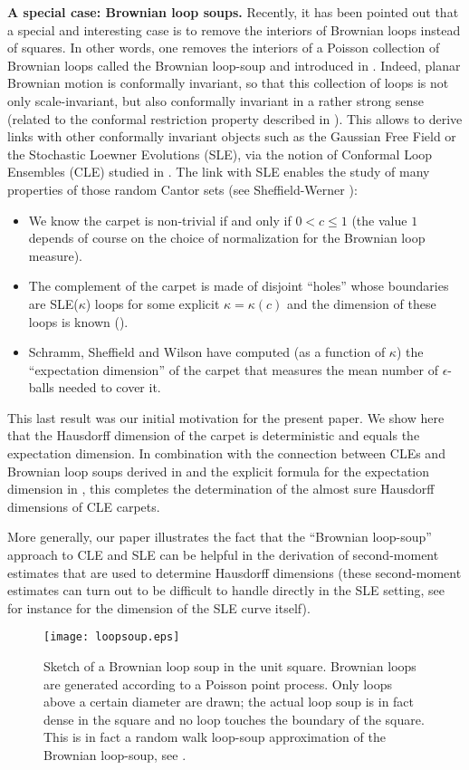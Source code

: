 \documentclass[11pt]{article}
\begin{document}
\medbreak
{\bf A special case: Brownian loop soups.}
Recently, it has been pointed out that a special and interesting case is 
to remove the interiors of Brownian loops instead of squares. 
In other words, one removes the interiors of a Poisson collection of 
Brownian loops called the Brownian loop-soup and introduced in \cite {LWls}. 
Indeed, planar Brownian motion is conformally invariant, so that this collection of loops 
is not only scale-invariant, but also conformally invariant in a rather strong sense 
(related to the conformal restriction property described in \cite {LSWrest,Wsal}). 
This allows \cite {Wcras,ShW} to derive links
with other conformally invariant objects such as the Gaussian Free Field 
or the Stochastic Loewner Evolutions (SLE), via the notion of 
Conformal Loop Ensembles (CLE) studied in \cite {Sh,ShW}. 
The link with SLE enables the study of many properties of those random Cantor sets 
(see Sheffield-Werner \cite {ShW, ShW2}):
\begin {itemize}
\item
We know the carpet is non-trivial if and only if $0 < c \le 1$ 
(the value $1$ depends of course on the choice of normalization 
for the Brownian loop measure).
\item
The complement of the carpet is made of disjoint ``holes''  whose boundaries
are SLE($\kappa$) loops for some explicit $\kappa=\kappa (c)$ 
and the dimension of these loops is known (\cite {Be,Ladim}). 
\item
Schramm, Sheffield and Wilson \cite {SchShW} have computed (as a function of $\kappa$)
the ``expectation dimension'' 
of the carpet that measures the mean number of $\epsilon$-balls needed to cover it.
\end {itemize}
This last result was our initial motivation for the present paper. 
We show here that the Hausdorff dimension of the carpet is deterministic and
equals the expectation dimension.
In combination with the connection between 
CLEs and Brownian loop soups derived in \cite {ShW,ShW2} and
the explicit formula for the expectation dimension in \cite{SchShW}, 
this completes the determination 
of the almost sure Hausdorff dimensions of CLE carpets.

More generally, our paper illustrates the fact that the ``Brownian loop-soup'' 
approach to CLE and SLE can be helpful in the derivation of second-moment estimates that are
used to determine Hausdorff dimensions (these second-moment estimates can turn out to be difficult to handle directly in the SLE setting, see 
for instance \cite {Be} for the dimension of the SLE curve itself). 
\begin{figure}\label{brownian_soup}
\centerline{\texttt{[image: loopsoup.eps]}}
\caption {
Sketch of a Brownian loop soup in the unit square. Brownian loops are generated according
to a Poisson point process. Only loops above a certain diameter are
drawn; the actual loop soup is in fact dense in the square and no loop touches the boundary of the square.
This is in fact a random walk loop-soup approximation of the Brownian loop-soup, see \cite {LTF}.
}
\end {figure}
\medbreak
\end{document}
